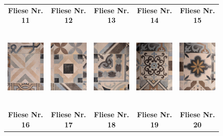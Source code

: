 \documentclass{cssheet}
\begin{document}
\begin{figure}[H]
\begin{tabular}{ccccc}
		\textbf{Fliese Nr. 11} & \textbf{Fliese Nr. 12} & \textbf{Fliese Nr. 13} & \textbf{Fliese Nr. 14} & \textbf{Fliese Nr. 15} \\
		\includegraphics[height=4cm]{fliesen/fliese11.jpg} &
		\includegraphics[height=4cm]{fliesen/fliese12.jpg} &
		\includegraphics[height=4cm]{fliesen/fliese13.jpg} &
		\includegraphics[height=4cm]{fliesen/fliese14.jpg} &
		\includegraphics[height=4cm]{fliesen/fliese15.jpg} \\
		\textbf{Fliese Nr. 16} & \textbf{Fliese Nr. 17} & \textbf{Fliese Nr. 18} & \textbf{Fliese Nr. 19} & \textbf{Fliese Nr. 20} \\

\end{tabular}
\end{figure}
\end{document}
